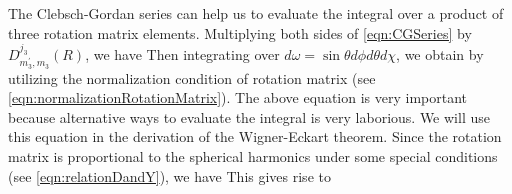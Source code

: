 The Clebsch-Gordan series can help us to evaluate the integral over a product of three rotation matrix elements. 
Multiplying both sides of \autoref{eqn:CGSeries} by $D^{j_3}_{m_3^{\prime}, m_3}(R)$, we have
Then integrating over $d\omega = \sin\theta d\phi d\theta d\chi$, we obtain
by utilizing the normalization condition of rotation matrix (see \autoref{eqn:normalizationRotationMatrix}). The 
above equation is very important because alternative ways to evaluate the integral is very laborious. We will use this
equation in the derivation of the Wigner-Eckart theorem. 
Since the rotation matrix is proportional to the spherical
harmonics under some special conditions (see \autoref{eqn:relationDandY}), we have
This gives rise to



